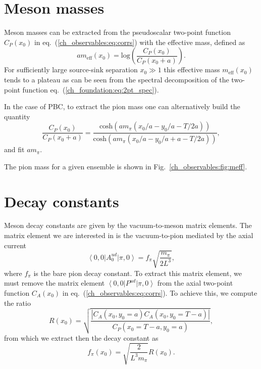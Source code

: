 \section{Meson masses}
\label{ch_observables:sec:meson_mass}

Meson masses can be extracted from the pseudoscalar two-point function $C_P(x_0)$ in eq.~(\ref{ch_observables:eq:corrs}) with the effective mass, defined as
\begin{equation}
\label{ch_observables:eq:meff}
am_{\textrm{eff}}(x_0)={\textrm{log}}\left(\frac{C_P(x_0)}{C_P(x_0+a)}\right).
\end{equation}
For sufficiently large source-sink separation $x_0\gg 1$ this effective mass $m_{\textrm{eff}}(x_0)$ tends to a plateau as can be seen from the spectral decomposition of the two-point function eq.~(\ref{ch_foundation:eq:2pt_spec}).

In the case of PBC, to extract the pion mass one can alternatively build the quantity
\begin{equation}
\label{ch_observables:eq:meff_PBC}
\frac{C_P(x_0)}{C_P(x_0+a)}=\frac{{\textrm{cosh}}(am_{\pi}(x_0/a-y_0/a-T/2a))}{{\textrm{cosh}}(am_{\pi}(x_0/a-y_0/a+a-T/2a))},
\end{equation}
and fit $am_{\pi}$.

The pion mass for a given ensemble is shown in Fig.~\ref{ch_observables:fig:meff}.


\section{Decay constants}
\label{ch_observables:sec:dec_const}

Meson decay constants are given by the vacuum-to-meson matrix elements. The matrix element we are interested in is the vacuum-to-pion mediated by the axial current
\begin{equation}
\label{ch_observables:eq:axial_matrix_element}
\left<0,0\right|A_0^{ud}\left|\pi,0\right>=f_{\pi}\sqrt{\frac{m_{\pi}}{2L^3}},
\end{equation}
where $f_{\pi}$ is the bare pion decay constant. To extract this matrix element, we must remove the matrix element $\left<0,0\right|P^{ud}\left|\pi,0\right>$ from the axial two-point function $C_A(x_0)$ in eq.~(\ref{ch_observables:eq:corrs}). To achieve this, we compute the ratio
\begin{equation}
\label{ch_observables:eq:R}
R(x_0)=\sqrt{\frac{\left|C_A(x_0,y_0=a)C_A(x_0,y_0=T-a)\right|}{C_P(x_0=T-a,y_0=a)}},
\end{equation}
from which we extract then the decay constant as
\begin{equation}
f_{\pi}(x_0)=\sqrt{\frac{2}{L^3m_{\pi}}}R(x_0).
\end{equation}

